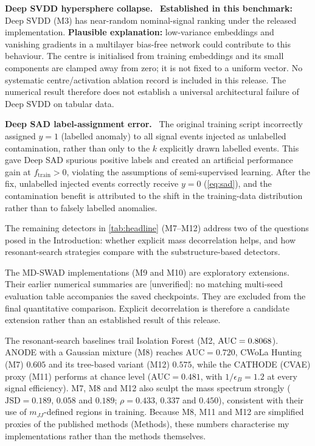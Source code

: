 \documentclass[11pt,a4paper]{article}
\newcommand{\subhead}[1]{\par\vspace{4pt}{\sffamily\bfseries\normalsize #1}\par\nopagebreak\vspace{1pt}}
\newcommand{\runin}[1]{\par\vspace{2pt}\textbf{#1.}\ }
\newcommand{\ftrain}{f_{\mathrm{train}}}
\newcommand{\klabels}{k}
\newcommand{\eB}{\epsilon_B}
\newcommand{\auc}{\mathrm{AUC}}
\newcommand{\mjj}{m_{JJ}}
\newcommand{\jsd}{\mathrm{JSD}}
\begin{document}
\subhead{Failure modes}
\runin{Deep SVDD hypersphere collapse}
\textbf{Established in this benchmark:} Deep SVDD (M3) has near-random
nominal-signal ranking under the released implementation.\cite{Ruff2018}
\textbf{Plausible explanation:} low-variance embeddings and vanishing
gradients in a multilayer bias-free network could contribute to this
behaviour. The centre is initialised from training embeddings and its small
components are clamped away from zero; it is not fixed to a uniform vector.
No systematic centre/activation ablation record is included in this release.
The numerical result therefore does not establish a universal architectural
failure of Deep SVDD on tabular data.

\runin{Deep SAD label-assignment error}
The original training script incorrectly assigned $y=1$ (labelled
anomaly) to all signal events injected as unlabelled contamination,
rather than only to the $\klabels$ explicitly drawn labelled events.
This gave Deep SAD spurious positive labels and created an
artificial performance gain at $\ftrain > 0$, violating the
assumptions of semi-supervised learning. After the fix, unlabelled injected
events correctly receive $y=0$ (\cref{eq:sad}), and the contamination
benefit is attributed to the shift in the training-data distribution
rather than to falsely labelled anomalies.

\subhead{Mass-decorrelated and resonant-search baselines}
The remaining detectors in \cref{tab:headline} (M7--M12) address two of the questions posed in
the Introduction: whether explicit mass decorrelation helps, and how resonant-search
strategies compare with the substructure-based detectors.

The MD-SWAD implementations (M9 and M10) are exploratory extensions.
Their earlier numerical summaries are [unverified]: no matching multi-seed
evaluation table accompanies the saved checkpoints. They are excluded from
the final quantitative comparison. Explicit decorrelation is therefore a
candidate extension rather than an established result of this release.

The resonant-search baselines trail Isolation Forest (M2, $\auc = \IFMean$). ANODE with a Gaussian
mixture (M8) reaches $\auc = 0.720$, CWoLa Hunting (M7) $0.605$ and its tree-based variant
(M12) $0.575$, while the CATHODE (CVAE) proxy (M11) performs at chance level
($\auc = 0.481$, with $1/\eB = 1.2$ at every signal efficiency). M7, M8 and M12 also sculpt
the mass spectrum strongly ($\jsd = 0.189$, $0.058$ and $0.189$; $\rho = 0.433$, $0.337$ and
$0.450$), consistent with their use of $\mjj$-defined regions in training. Because M8, M11 and M12 are
simplified proxies of the published methods (Methods), these numbers characterise my
implementations rather than the methods themselves.
\end{document}

